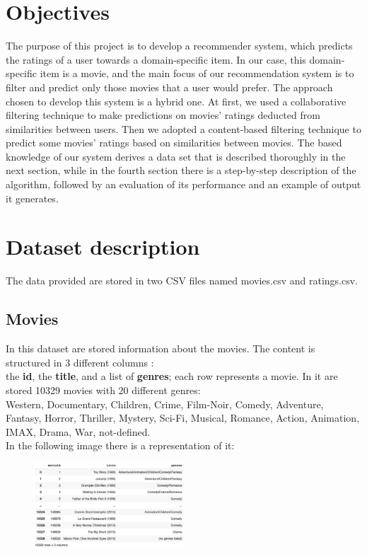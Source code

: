 \documentclass{article}
\begin{document}
\newpage

\section{Objectives}

The purpose of this project is to develop a recommender system, which predicts the ratings of a user towards a domain-specific item. In our case, this domain-specific item is a movie, and the main focus of our recommendation system is to filter and predict only those movies that a user would prefer. The approach chosen to develop this system is a hybrid one. At first, we used a collaborative filtering technique to make predictions on movies' ratings deducted from similarities between users. Then we adopted a content-based filtering technique to predict some movies' ratings based on similarities between movies. The based knowledge of our system derives a data set that is described thoroughly in the next section, while in the fourth section there is a step-by-step description of the algorithm, followed by an evaluation of its performance and an example of output it generates.

\section{Dataset description}
The data provided are stored in two CSV files named movies.csv and ratings.csv.

\subsection{Movies}
In this dataset are stored information about the movies. The content is structured in 3 different columns : \\
the \textbf{id}, the \textbf{title}, and a list of \textbf{genres}; each row represents a movie. In it are stored 10329 movies with 20 different genres:\\ Western, Documentary, Children, Crime, Film-Noir, Comedy, Adventure, Fantasy, Horror, Thriller, Mystery, Sci-Fi, Musical, Romance, Action, Animation, IMAX, Drama, War, not-defined. \\
In the following image there is a representation of it:
\begin{figure}[ht]
      \begin{center}
            \includegraphics[width=0.5\textwidth]{images/movies data.png}
      \end{center}
\end{figure}
\end{document}
